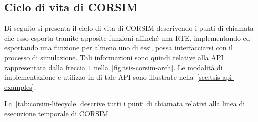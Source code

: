 \subsection{Ciclo di vita di CORSIM}\label{sec:corsim-lifecycle}
Di seguito si presenta il ciclo di vita di \acs{CORSIM} descrivendo i punti di chiamata che esso esporta tramite apposite funzioni affinché una \acs{RTE}, implementando ed esportando una funzione per almeno uno di essi, possa interfacciarsi con il processo di simulazione. Tali informazioni sono quindi relative alla \acs{API} rappresentata dalla freccia $1$ nella~\vref{fig:tsis-corsim-arch}. Le modalità di implementazione e utilizzo in \CC{} di tale \acs{API} sono illustrate nella~\vref{sec:tsis-api-examples}.

La~\vref{tab:corsim-lifecycle} descrive tutti i punti di chiamata relativi alla linea di esecuzione temporale di \acs{CORSIM}.

